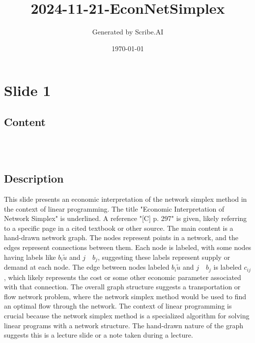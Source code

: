 \documentclass{article}%
\title{2024{-}11{-}21{-}EconNetSimplex}%
\author{Generated by Scribe.AI}%
\date{\today}%
\begin{document}
%
\normalsize%
\maketitle%
\section{Slide 1}%
\label{sec:Slide1}%
\subsection{Content}%

 \\
\underline{} \\
%
\subsection{Description}%
This slide presents an economic interpretation of the network simplex method in the context of linear programming. The title "Economic Interpretation of Network Simplex" is underlined. A reference "[C] p. 297" is given, likely referring to a specific page in a cited textbook or other source. The main content is a hand-drawn network graph. The nodes represent points in a network, and the edges represent connections between them.  Each node is labeled, with some nodes having labels like $b_i \tilde{u}$ and $j \quad b_j$, suggesting these labels represent supply or demand at each node. The edge between nodes labeled $b_i \tilde{u}$ and $j \quad b_j$ is labeled $c_{ij}$, which likely represents the cost or some other economic parameter associated with that connection. The overall graph structure suggests a transportation or flow network problem, where the network simplex method would be used to find an optimal flow through the network. The context of linear programming is crucial because the network simplex method is a specialized algorithm for solving linear programs with a network structure. The hand-drawn nature of the graph suggests this is a lecture slide or a note taken during a lecture.%
\end{document}

